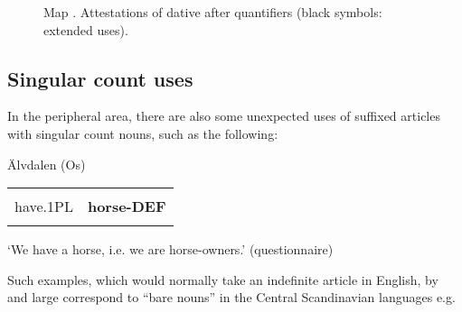 \begin{figure}[h]

\begin{minipage}{4.9835in}

\begin{stylecaption}
Map . Attestations of dative after quantifiers (black symbols: extended uses).

\end{stylecaption}

\end{minipage}

\end{figure}

\subsection{\rmfamily Singular count uses}
\label{bkm:Ref224379285}
\begin{styleBodyTextFirst}
In the peripheral area, there are also some unexpected uses of suffixed articles with singular count nouns, such as the following:

\end{styleBodyTextFirst}

\begin{listWWNumileveli}
\item {}

\begin{styleExample}
\label{bkm:Ref224102863}Älvdalen (Os)

\end{styleExample}

\end{listWWNumileveli}

\begin{tabular}{ll}
\lsptoprule
\multicolumn{2}{l}{Am

}\\
have.1PL & {\bfseries horse-DEF}\\
\lspbottomrule
\end{tabular}

\begin{styleTranslation}
‘We have a horse, i.e. we are horse-owners.’ (questionnaire)

\end{styleTranslation}

\begin{styleBodyTextFirst}
Such examples, which would normally take an indefinite article in English, by and large correspond to “bare nouns” in the Central Scandinavian languages e.g.

\end{styleBodyTextFirst}

